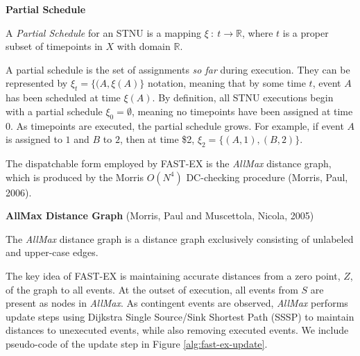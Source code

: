 \documentclass[11pt]{article}
\begin{document}
\begin{defn}
\textbf{Partial Schedule}

A \emph{Partial Schedule} for an STNU is a mapping \(\xi ~:~ t \rightarrow \mathbb{R}\), where \(t\) is a
proper subset of timepoints in \(X\) with domain \(\mathbb{R}\).
\end{defn}

A partial schedule is the set of assignments \emph{so far} during execution. They can be represented by
\(\xi_{t} = \{ (A, \xi(A) \}\) notation, meaning that by some time \(t\), event \(A\) has been scheduled
at time \(\xi(A)\). By definition, all STNU executions begin with a partial schedule \(\xi_{0} =
\emptyset\), meaning no timepoints have been assigned at time \(0\). As timepoints are executed, the
partial schedule grows. For example, if event \(A\) is assigned to \(1\) and \(B\) to \(2\), then at time
\$2, \(\xi_{2} = \{ (A, 1), (B, 2) \}\).

The dispatchable form employed by FAST-EX is the \emph{AllMax} distance graph, which is produced by the
Morris \(O(N^{4})\) DC-checking procedure (Morris, Paul, 2006).

\begin{defn}
\textbf{AllMax Distance Graph} (Morris, Paul and Muscettola, Nicola, 2005)

The \emph{AllMax} distance graph is a distance graph exclusively consisting of unlabeled and upper-case
edges.
\end{defn}

The key idea of FAST-EX is maintaining accurate distances from a zero point, \(Z\), of the graph to
all events. At the outset of execution, all events from \(S\) are present as nodes in \emph{AllMax}. As
contingent events are observed, \emph{AllMax} performs update steps using Dijkstra Single Source/Sink
Shortest Path (SSSP) to maintain distances to unexecuted events, while also removing executed
events. We include pseudo-code of the update step in Figure \ref{alg:fast-ex-update}.
\end{document}
